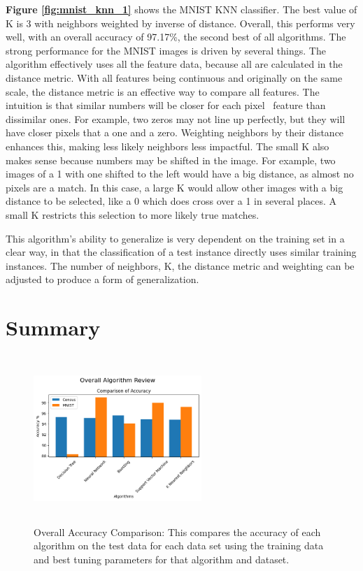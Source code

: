 \documentclass[letterpaper]{article} %
\begin{document}
\textbf{Figure \ref{fig:mnist_knn_1}} shows the MNIST KNN classifier.  The best value of K is 3 with neighbors weighted by inverse of distance.  Overall, this performs very well, with an overall accuracy of 97.17\%, the second best of all algorithms.  The strong performance for the MNIST images is driven by several things.  The algorithm effectively uses all the feature data, because all are calculated in the distance metric.  With all features being continuous and originally on the same scale, the distance metric is an effective way to compare all features.  The intuition is that similar numbers will be closer for each pixel \ feature than dissimilar ones.  For example, two zeros may not line up perfectly, but they will have closer pixels that a one and a zero.  Weighting neighbors by their distance enhances this, making less likely neighbors less impactful.   The small K also makes sense because numbers may be shifted in the image. For example, two images of a 1 with one shifted to the left would have a big distance, as almost no pixels are a match.  In this case, a large K would allow other images with a big distance to be selected, like a 0 which does cross over a 1 in several places.  A small K restricts this selection to more likely true matches.

This algorithm's ability to generalize is very dependent on the training set in a clear way, in that the classification of a test instance directly uses similar training instances.  The number of neighbors, K, the distance metric and weighting can be adjusted to produce a form of generalization.

\section{Summary}

\begin{figure}[h]
\centering
\includegraphics[width=2.5in, height=2.5in]{figures/Overall_Algorithm_ReviewComparison_of_Accuracy_.png}
\caption{Overall Accuracy Comparison:  This compares the accuracy of each algorithm on the test data for each data set using the training data and best tuning parameters for that algorithm and dataset.  }
\label{fig:overall_accuracy}
\end{figure}
\end{document}
